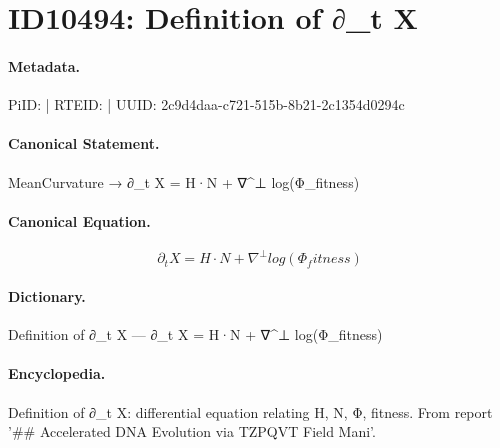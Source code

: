 \section*{ID10494: Definition of ∂\_t X}
\paragraph{Metadata.}
PiID:  | RTEID:  | UUID: 2c9d4daa-c721-515b-8b21-2c1354d0294c

\paragraph{Canonical Statement.}
MeanCurvature → ∂\_t X = H·N + ∇\textasciicircum{}⊥ log(Φ\_fitness)

\paragraph{Canonical Equation.}
\[
∂_t X = H·N + ∇^⊥ log(Φ_fitness)
\]

\paragraph{Dictionary.}
Definition of ∂\_t X — ∂\_t X = H·N + ∇\textasciicircum{}⊥ log(Φ\_fitness)

\paragraph{Encyclopedia.}
Definition of ∂\_t X: differential equation relating H, N, Φ, fitness. From report '\#\# Accelerated DNA Evolution via TZPQVT Field Mani'.
